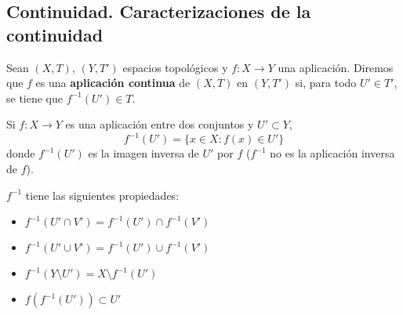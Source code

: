 \subsection{Continuidad. Caracterizaciones de la continuidad}
\begin{ndef}
  Sean $(X,T)$, $(Y,T')$ espacios topológicos y $f: X \to Y$ una aplicación. Diremos que $f$ es una \textbf{aplicación continua} de $(X,T)$ en $(Y,T')$ si, para todo $U' \in T'$, se tiene que $f^{-1}(U') \in T$.
\end{ndef}
\begin{note}
  Si $f: X \to Y$ es una aplicación entre dos conjuntos y $U' \subset Y$,
  \[f^{-1}(U')=\{x \in X: f(x) \in U'\}\]
  donde $f^{-1}(U')$ es la imagen inversa de $U'$ por $f$ ($f^{-1}$ no es la aplicación inversa de $f$).
\end{note}
\begin{properties}
    $f^{-1}$ tiene las siguientes propiedades:
  \begin{itemize}
      \item $f^{-1}(U' \cap V')=f^{-1}(U') \cap f^{-1}(V')$
      \item $f^{-1}(U' \cup V')=f^{-1}(U') \cup f^{-1}(V')$
      \item $f^{-1}(Y \setminus U')=X \setminus f^{-1}(U')$
      \item $f(f^{-1}(U')) \subset U'$
  \end{itemize}
\end{properties}

